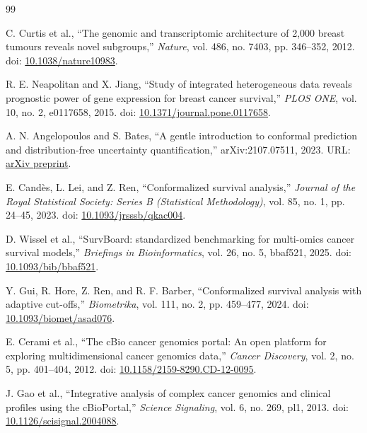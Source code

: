 \documentclass[12pt]{article}
\begin{document}
\begin{thebibliography}{99}

C. Curtis et al., ``The genomic and transcriptomic architecture of 2,000 breast
tumours reveals novel subgroups,'' \textit{Nature}, vol. 486, no. 7403,
pp. 346--352, 2012. doi: \href{https://doi.org/10.1038/nature10983}{10.1038/nature10983}.

R. E. Neapolitan and X. Jiang, ``Study of integrated heterogeneous data reveals
prognostic power of gene expression for breast cancer survival,''
\textit{PLOS ONE}, vol. 10, no. 2, e0117658, 2015.
doi: \href{https://doi.org/10.1371/journal.pone.0117658}{10.1371/journal.pone.0117658}.

A. N. Angelopoulos and S. Bates, ``A gentle introduction to conformal prediction
and distribution-free uncertainty quantification,'' arXiv:2107.07511, 2023.
URL: \href{https://arxiv.org/abs/2107.07511}{arXiv preprint}.

E. Candès, L. Lei, and Z. Ren, ``Conformalized survival analysis,''
\textit{Journal of the Royal Statistical Society: Series B (Statistical Methodology)},
vol. 85, no. 1, pp. 24--45, 2023.
doi: \href{https://doi.org/10.1093/jrsssb/qkac004}{10.1093/jrsssb/qkac004}.

D. Wissel et al., ``SurvBoard: standardized benchmarking for multi-omics cancer
survival models,'' \textit{Briefings in Bioinformatics}, vol. 26, no. 5,
bbaf521, 2025.
doi: \href{https://doi.org/10.1093/bib/bbaf521}{10.1093/bib/bbaf521}.

Y. Gui, R. Hore, Z. Ren, and R. F. Barber, ``Conformalized survival analysis
with adaptive cut-offs,'' \textit{Biometrika}, vol. 111, no. 2,
pp. 459--477, 2024.
doi: \href{https://doi.org/10.1093/biomet/asad076}{10.1093/biomet/asad076}.

E. Cerami et al., ``The cBio cancer genomics portal: An open platform for
exploring multidimensional cancer genomics data,'' \textit{Cancer Discovery},
vol. 2, no. 5, pp. 401--404, 2012.
doi: \href{https://doi.org/10.1158/2159-8290.CD-12-0095}{10.1158/2159-8290.CD-12-0095}.

J. Gao et al., ``Integrative analysis of complex cancer genomics and clinical
profiles using the cBioPortal,'' \textit{Science Signaling}, vol. 6, no. 269,
pl1, 2013.
doi: \href{https://doi.org/10.1126/scisignal.2004088}{10.1126/scisignal.2004088}.


\end{thebibliography}
\end{document}
